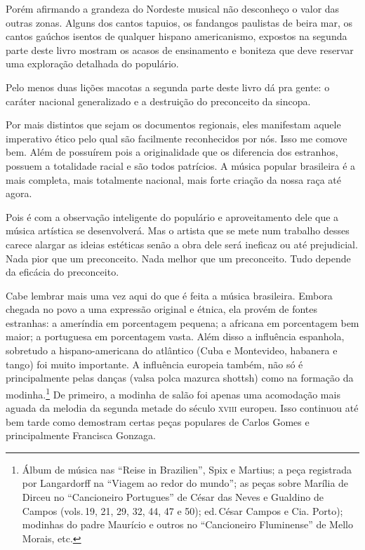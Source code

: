 Porém afirmando a grandeza do Nordeste musical não desconheço o valor
das outras zonas. Alguns dos cantos tapuios, os fandangos paulistas de
beira mar, os cantos gaúchos isentos de qualquer hispano americanismo,
expostos na segunda parte deste livro mostram os acasos de ensinamento e
boniteza que deve reservar uma exploração detalhada do populário.

Pelo menos duas lições macotas a segunda parte deste livro dá pra gente:
o caráter nacional generalizado e a destruição do preconceito da
sincopa.

Por mais distintos que sejam os documentos regionais, eles manifestam
aquele imperativo ético pelo qual são facilmente reconhecidos por nós.
Isso me comove bem. Além de possuírem pois a originalidade que os
diferencia dos estranhos, possuem a totalidade racial e são todos
patrícios. A música popular brasileira é a mais completa, mais
totalmente nacional, mais forte criação da nossa raça até agora.

Pois é com a observação inteligente do populário e aproveitamento dele
que a música artística se desenvolverá. Mas o artista que se mete num
trabalho desses carece alargar as ideias estéticas senão a obra dele
será ineficaz ou até prejudicial. Nada pior que um preconceito. Nada
melhor que um preconceito. Tudo depende da eficácia do preconceito.

Cabe lembrar mais uma vez aqui do que é feita a música brasileira.
Embora chegada no povo a uma expressão original e étnica, ela provém de
fontes estranhas: a ameríndia em porcentagem pequena; a africana em
porcentagem bem maior; a portuguesa em porcentagem vasta. Além disso a
influência espanhola, sobretudo a hispano-americana do atlântico (Cuba e
Montevideo, habanera e tango) foi muito importante. A influência
europeia também, não só é principalmente pelas danças (valsa polca
mazurca shottsh) como na formação da modinha.\footnote{Álbum de música nas ``Reise in Brazilien'', Spix e Martius; a peça registrada por Langardorff na ``Viagem ao redor do mundo''; as peças sobre Marília de Dirceu no ``Cancioneiro Portugues'' de César das Neves e Gualdino de Campos (vols.\,19, 21, 29, 32, 44, 47 e 50); ed.\,César Campos e Cia. Porto); modinhas do padre Maurício e outros no ``Cancioneiro Fluminense'' de Mello Morais, etc.} De primeiro, a modinha de
salão foi apenas uma acomodação mais aguada da melodia da segunda metade
do século \textsc{xviii} europeu. Isso continuou até bem tarde como demostram
certas peças populares de Carlos Gomes e principalmente Francisca
Gonzaga.

